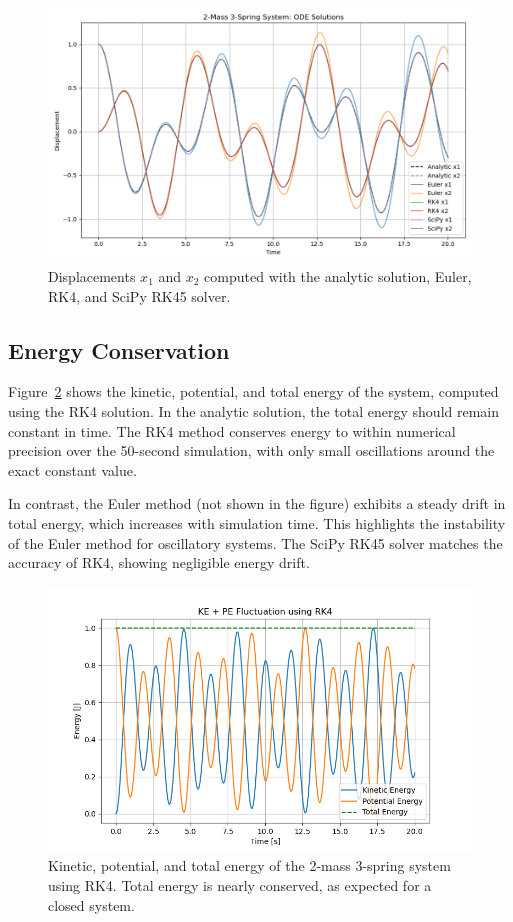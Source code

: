 \documentclass[12pt]{article}
\begin{document}
\begin{figure}[h!]
    \centering
    \includegraphics[width=1\textwidth]{Figure_1.png}
    \caption{Displacements $x_1$ and $x_2$ computed with the analytic solution, Euler, RK4, and SciPy RK45 solver.}
    \label{fig:positions}
\end{figure}

\subsection{Energy Conservation}
Figure~\ref{fig:energy} shows the kinetic, potential, and total energy of the system, computed using the RK4 solution. In the analytic solution, the total energy should remain constant in time. The RK4 method conserves energy to within numerical precision over the 50-second simulation, with only small oscillations around the exact constant value. 

In contrast, the Euler method (not shown in the figure) exhibits a steady drift in total energy, which increases with simulation time. This highlights the instability of the Euler method for oscillatory systems. The SciPy RK45 solver matches the accuracy of RK4, showing negligible energy drift.

\begin{figure}[h!]
    \centering
    \includegraphics[width=1\textwidth]{Figure_2.png}
    \caption{Kinetic, potential, and total energy of the 2-mass 3-spring system using RK4. Total energy is nearly conserved, as expected for a closed system.}
    \label{fig:energy}
\end{figure}
\end{document}
